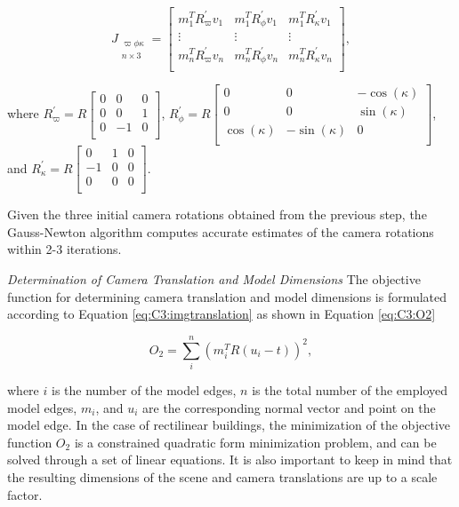 \begin{equation}
   J_{\substack{
       \varpi \phi \kappa \\
        n \times 3     
   }} =
   \begin{bmatrix}
m_1^TR_{\varpi}^{'}v_1 &   m_1^TR_{\phi}^{'}v_1 & m_1^TR_{\kappa}^{'}v_1 \\
\vdots  & \vdots & \vdots \\
m_n^TR_{\varpi}^{'}v_n &   m_n^TR_{\phi}^{'}v_n & m_n^TR_{\kappa}^{'}v_n \\  
     \end{bmatrix}, 
\label{eq:C3:Jmatrix}
\end{equation}      

where $R_{\varpi}^{'} = R
\begin{bmatrix}
0 & 0 & 0  \\
0 & 0 & 1 \\
0 & -1 & 0 \\
 \end{bmatrix}  
$, 
$R_{\phi}^{'} = R
\begin{bmatrix}
0 & 0 & -\cos(\kappa)  \\
0 & 0 & \sin(\kappa) \\
\cos(\kappa) & -\sin(\kappa) & 0 \\
 \end{bmatrix}  
$, and 
$R_{\kappa}^{'} = R
\begin{bmatrix}
0 & 1 & 0  \\
-1 & 0 & 0 \\
0 & 0 & 0 \\
 \end{bmatrix}  
$. 

Given the three initial camera rotations obtained from the previous step, the Gauss-Newton algorithm computes accurate estimates of the camera rotations within 2-3 iterations.

{\it Determination of Camera Translation and Model Dimensions} The objective function for determining camera translation and model dimensions is formulated according to Equation \ref{eq:C3:imgtranslation} as shown in Equation \ref{eq:C3:O2}

\begin{equation}
   O_2 = \sum_i^n(m_i^TR(u_i- t))^2,
\label{eq:C3:O2}
\end{equation}      

where $i$ is the number of the model edges, $n$ is the total number of the employed model edges, $m_i$, and $u_i$ are the corresponding normal vector and point on the model edge. In the case of rectilinear buildings, the minimization of the objective function $O_2$ is a constrained quadratic form minimization problem, and can be solved through a set of linear equations. It is also important to keep in mind that the resulting dimensions of the scene and camera translations are up to a scale factor. 

